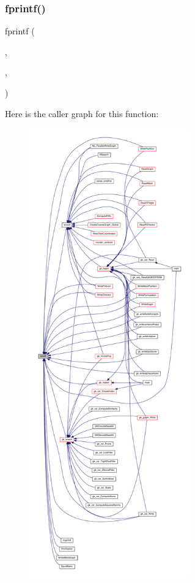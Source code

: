\subsubsection{\texorpdfstring{fprintf()}{fprintf()}\hspace{0.1cm}{\footnotesize\ttfamily [1/12]}}
{\footnotesize\ttfamily fprintf (\begin{DoxyParamCaption}\item[{\hyperlink{a00473_ae0527cbfd56392d5095a691bbf10ba5b}{f\+ID}}]{,  }\item[{\textquotesingle{}\#ifndef D\+A\+T\+A\+\_\+\%\hyperlink{a00623_a781a04ab095280f838ff3eb0e51312e0}{s\textbackslash{}n}\textquotesingle{}}]{,  }\item[{\hyperlink{a00473_a9e84386471d07238c03b10507f58eba9}{elem\+\_\+type}}]{ }\end{DoxyParamCaption})}

Here is the caller graph for this function\+:\nopagebreak
\begin{figure}[H]
\begin{center}
\leavevmode
\includegraphics[height=550pt]{a01014_a1c26c3e6fd09ad3f614fd2a28762dfe8_icgraph}
\end{center}
\end{figure}
\mbox{\label{a01014_a1bb04a6273aae6e9af3378600ca9fcb3}} 
